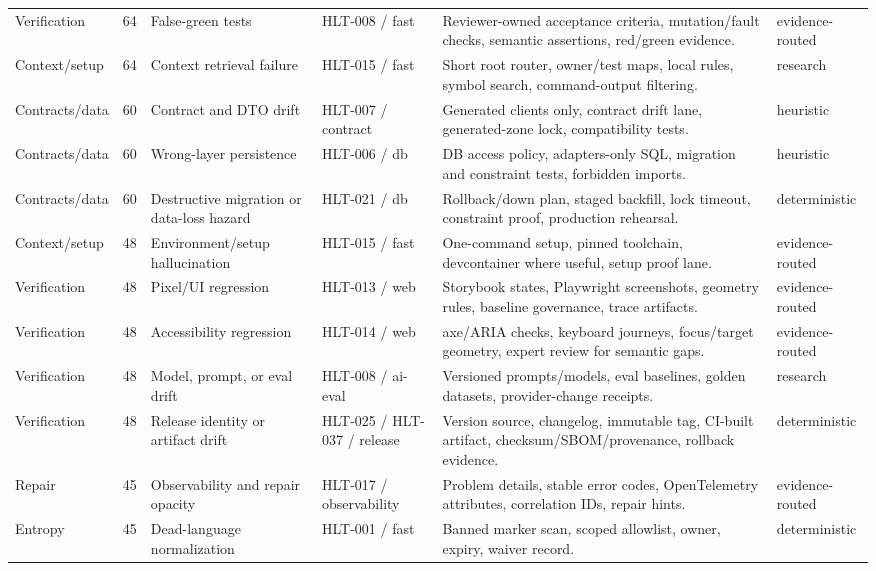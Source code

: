 \begin{table}[t]
\begin{tabularx}{\textwidth}{L{0.12\textwidth} R{0.04\textwidth} L{0.16\textwidth} L{0.15\textwidth} Y L{0.13\textwidth}}
Verification & 64 & False-green tests & HLT-008 / fast & Reviewer-owned acceptance criteria, mutation/fault checks, semantic assertions, red/green evidence. & evidence-routed \\
Context/setup & 64 & Context retrieval failure & HLT-015 / fast & Short root router, owner/test maps, local rules, symbol search, command-output filtering. & research \\
Contracts/data & 60 & Contract and DTO drift & HLT-007 / contract & Generated clients only, contract drift lane, generated-zone lock, compatibility tests. & heuristic \\
Contracts/data & 60 & Wrong-layer persistence & HLT-006 / db & DB access policy, adapters-only SQL, migration and constraint tests, forbidden imports. & heuristic \\
Contracts/data & 60 & Destructive migration or data-loss hazard & HLT-021 / db & Rollback/down plan, staged backfill, lock timeout, constraint proof, production rehearsal. & deterministic \\
Context/setup & 48 & Environment/setup hallucination & HLT-015 / fast & One-command setup, pinned toolchain, devcontainer where useful, setup proof lane. & evidence-routed \\
Verification & 48 & Pixel/UI regression & HLT-013 / web & Storybook states, Playwright screenshots, geometry rules, baseline governance, trace artifacts. & evidence-routed \\
Verification & 48 & Accessibility regression & HLT-014 / web & axe/ARIA checks, keyboard journeys, focus/target geometry, expert review for semantic gaps. & evidence-routed \\
Verification & 48 & Model, prompt, or eval drift & HLT-008 / ai-eval & Versioned prompts/models, eval baselines, golden datasets, provider-change receipts. & research \\
Verification & 48 & Release identity or artifact drift & HLT-025 / HLT-037 / release & Version source, changelog, immutable tag, CI-built artifact, checksum/SBOM/provenance, rollback evidence. & deterministic \\
Repair & 45 & Observability and repair opacity & HLT-017 / observability & Problem details, stable error codes, OpenTelemetry attributes, correlation IDs, repair hints. & evidence-routed \\
Entropy & 45 & Dead-language normalization & HLT-001 / fast & Banned marker scan, scoped allowlist, owner, expiry, waiver record. & deterministic \\

\end{tabularx}
\end{table}
